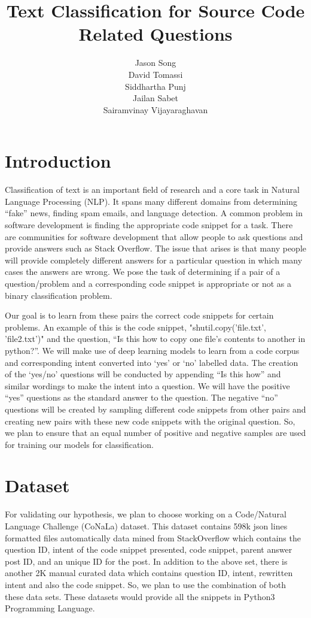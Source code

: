 \documentclass[11pt,a4paper]{article}
\title{Text Classification for Source Code Related Questions}
\author{
  Jason Song \\ \And
  David Tomassi \\ \And
  Siddhartha Punj\\ \AND
  Jailan Sabet\\ \And
  Sairamvinay Vijayaraghavan}
\date{}
\begin{document}
\maketitle

\section{Introduction}
Classification of text is an important field of research and a core
task in Natural Language Processing (NLP). It spans many different
domains from determining “fake” news, finding spam emails, and
language detection. A common problem in software development is
finding the appropriate code snippet for a task. There are communities
for software development that allow people to ask questions and
provide answers such as Stack Overflow. The issue that arises is that
many people will provide completely different answers for a particular
question in which many cases the answers are wrong. We pose the task
of determining if a pair of a question/problem and  a corresponding
code snippet is appropriate or not as a binary classification problem.

Our goal is to learn from these pairs the correct code snippets for
certain problems. An example of this is the code snippet,
"shutil.copy('file.txt', 'file2.txt')" and the question, “Is this how
to copy one file's contents to another in python?”. We will make use
of deep learning models to learn from a code corpus and corresponding
intent converted into ‘yes’ or ‘no’ labelled data. The creation of the
‘yes/no’ questions will be conducted by appending “Is this how” and
similar wordings to make the intent into a question. We will have the
positive “yes” questions as the standard answer to the question. The
negative “no” questions will be created by sampling different code
snippets from other pairs and creating new pairs with these new code
snippets with the original question. So, we plan to ensure that an
equal number of positive and negative samples are used for training
our models for classification.

\section{Dataset}
For validating our hypothesis, we plan to choose working on a
Code/Natural Language Challenge (CoNaLa) dataset. This dataset
contains 598k json lines formatted files automatically data mined from
StackOverflow which contains the question ID, intent of the code
snippet presented, code snippet, parent answer post ID, and an unique
ID for the post. In addition to the above set, there is another 2K
manual curated data which contains question ID, intent, rewritten
intent and also the code snippet. So, we plan to use the combination
of both these data sets. These datasets would provide all the snippets
in Python3 Programming Language.
\end{document}
